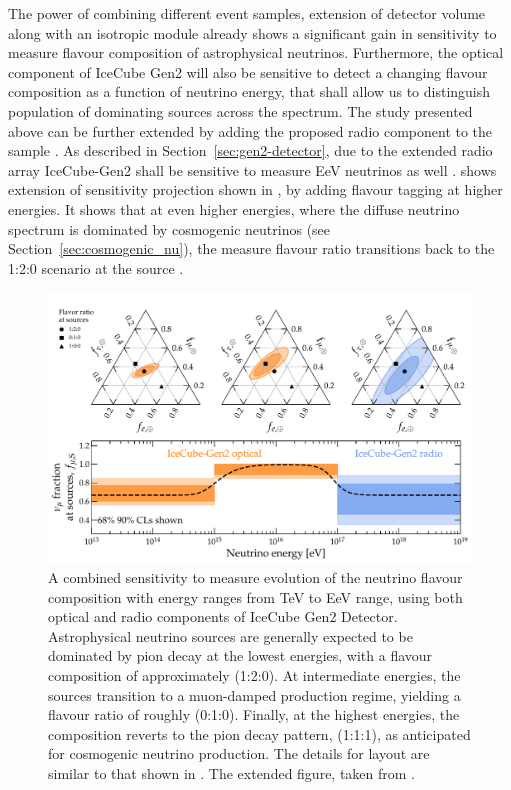 The power of combining different event samples, extension of detector volume along with an isotropic module already shows a significant gain in sensitivity to measure flavour composition of astrophysical neutrinos. Furthermore, the optical component of IceCube Gen2 will also be sensitive to detect a changing flavour composition as a function of neutrino energy, that shall allow us to distinguish population of dominating sources across the spectrum. The study presented above can be further extended by adding the proposed radio component to the sample . As described in Section~\ref{sec:gen2-detector}, due to the extended radio array IceCube-Gen2 shall be sensitive to measure EeV neutrinos as well .  shows extension of sensitivity projection shown in , by adding flavour tagging at higher energies. It shows that at even higher energies, where the diffuse neutrino spectrum is dominated by cosmogenic neutrinos (see Section~\ref{sec:cosmogenic_nu}), the measure flavour ratio transitions back to the 1:2:0 scenario at the source \cite{Coleman}.  


\begin{figure}[h!]
    \centering
        \includegraphics{./figures/gen2/energy_dependence_Gen2_TA-GZK.pdf}
        \caption{A combined sensitivity to measure evolution of the neutrino flavour composition with energy ranges from TeV to EeV range, using both optical and radio components of IceCube Gen2 Detector. Astrophysical neutrino sources are generally expected to be dominated by pion decay at the lowest energies, with a flavour composition of approximately (1:2:0). At intermediate energies, the sources transition to a muon-damped production regime, yielding a flavour ratio of roughly (0:1:0). Finally, at the highest energies, the composition reverts to the pion decay pattern, (1:1:1), as anticipated for cosmogenic neutrino production. The details for layout are similar to that shown in . The extended figure, taken from \cite{Coleman}.}
    \end{figure}

